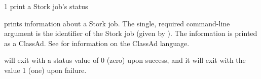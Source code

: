 \begin{ManPage}{\label{man-stork-status}}{1}
{print a Stork job's status}
\Synopsis {}
\ToolArgsBase




\Description 

 prints information about a Stork job.
The single, required command-line argument is the identifier
of the Stork job (given by ).
The information is printed as a ClassAd.
See  for information
on the ClassAd language.


\begin{Options}
	\ToolArgsBaseDesc
\end{Options}

\ExitStatus

 will exit with a status value of 0 (zero) upon success,
and it will exit with the value 1 (one) upon failure.

\end{ManPage}
